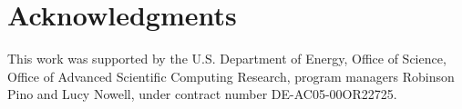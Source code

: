 \section{Acknowledgments}
\label{section:acknowledgments}

This work was supported by the U.S. Department of Energy, Office of Science, Office of Advanced Scientific Computing Research, program managers Robinson Pino and Lucy Nowell, under contract number DE-AC05-00OR22725. 